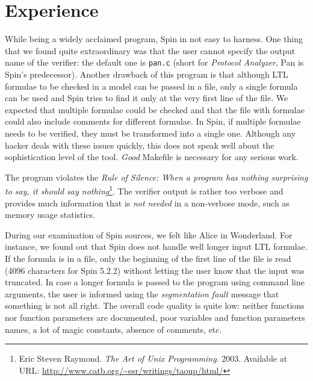
\section*{Experience}
\label{sec:experience}

While being a widely acclaimed program, Spin in not easy to harness. One thing that we found quite extraordinary was that the user cannot specify the output name of the verifier: the default one is \texttt{pan.c} (short for \emph{Protocol Analyzer}, Pan is Spin's predecessor). Another drawback of this program is that although LTL formulae to be checked in a model can be passed in a file, only a single formula can be used and Spin tries to find it only at the very first line of the file. We expected that multiple formulae could be checked and that the file with formulae could also include comments for different formulae. In Spin, if multiple formulae needs to be verified, they must be transformed into a single one. Although any hacker deals with these issues quickly, this does not speak well about the sophistication level of the tool. \emph{Good} Makefile is necessary for any serious work.

The program violates the \emph{Rule of Silence: When a program has nothing surprising to say, it should say nothing}\footnote{Eric Steven Raymond. \textit{The Art of Unix Programming}. 2003. Available at URL: \url{http://www.catb.org/~esr/writings/taoup/html/}}. The verifier output is rather too verbose and provides much information that is \emph{not needed} in a non-verbose mode, such as memory usage statistics.

During our examination of Spin sources, we felt like Alice in Wonderland. For instance, we found out that Spin does not handle well longer input LTL formulae. If the formula is in a file, only the beginning of the first line of the file is read (4096 characters for Spin 5.2.2) without letting the user know that the input was truncated. In case a longer formula is passed to the program using command line arguments, the user is informed using the \emph{segmentation fault} message that something is not all right. The overall code quality is quite low: neither functions nor function parameters are documented, poor variables and function parameters names, a lot of magic constants, absence of comments, etc.

